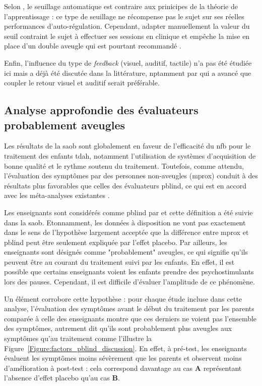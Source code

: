 Selon \citet{Arns2014}, le seuillage automatique est contraire aux prinicipes de la théorie de l'apprentissage : ce type de seuillage ne récompense
pas le sujet sur ses réelles performances d'auto-régulation. Cependant, adapter manuellement la valeur du seuil contraint le sujet à effectuer ses sessions en 
clinique et empêche la mise en place d'un double aveugle \citep{Lansbergen2011} qui est pourtant recommandé \citep{Ros2019}. 

Enfin, l'influence du type de \textit{feedback} (visuel, auditif, tactile) n'a pas été étudiée ici mais a déjà été discutée dans la littérature, nptamment par \citet{Vernon2004} qui a avancé que 
coupler le retour visuel et auditif serait préférable. 

\subsection{Analyse approfondie des évaluateurs probablement aveugles} \label{pblind_anaysis}

Les résultats de la \gls{saob} sont globalement en faveur de l'efficacité du \gls{nfb} pour le traitement des enfants \gls{tdah}, notamment l'utilisation 
de systèmes d'acquisition de bonne qualité et le rythme soutenu du traitement. Toutefois, comme attendu, l'évaluation
des symptômes par des personnes non-aveugles (\gls{mprox}) conduit à des résultats plus favorables que celles des évaluateurs \gls{pblind}, ce qui est en accord avec les
méta-analyses existantes \citep{Micoulaud2014, Cortese2016}. 

Les enseignants sont considérés comme \gls{pblind} par \citet{Cortese2016, Micoulaud2014} et cette définition a été suivie dans la \gls{saob}. Etonnamment, les données
à disposition ne vont pas exactement dans le sens de l'hypothèse largement acceptée que la différence entre \gls{mprox} et \gls{pblind} peut être seulement 
expliquée par l'effet placebo. Par ailleurs, les enseignants sont désignés comme "probablement" aveugles, ce qui signifie qu'ils peuvent être au courant du
traitement suivi par les enfants. En effet, il est possible que certains enseignants voient les enfants prendre des psychostimulants lors des pauses.
Cependant, il est difficile d'évaluer l'amplitude de ce phénomène. 

Un élément corrobore cette hypothèse : pour chaque étude incluse dans cette analyse, l'évaluation des symptômes avant le début
du traitement par les parents comparée à celle des enseignants montre que ces derniers ne voient pas l'ensemble des symptômes, autrement dit qu'ils sont probablement
plus aveugles aux symptômes qu'au traitement comme l'illustre la Figure~\ref{Figure:factors_pblind_discussion}. En effet, à pré-test, les enseignants évaluent les 
symptômes moins sévèrement que les parents et observent moins d'amélioration à post-test : cela correspond davantage au cas \textbf{A} représentant l'absence d'effet placebo
qu'au cas \textbf{B}.

